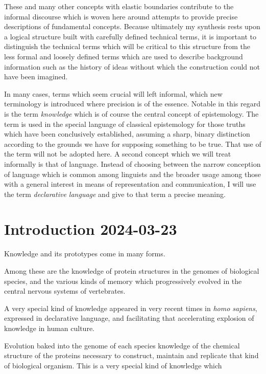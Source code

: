 \documentclass[10pt,titlepage]{book}
\begin{document}
These and many other concepts with elastic boundaries contribute to  the informal discourse which is woven here around attempts to provide precise descriptions of fundamental concepts.
Because ultimately my synthesis rests upon a logical structure built with carefully defined technical terms, it is important to distinguish the technical terms which will be critical to this structure from the less formal and loosely defined terms which are used to describe background information such as the history of ideas without which the construction could not have been imagined.

In many cases, terms which seem crucial will left informal, which new terminology is introduced where precision is of the essence.
Notable in this regard is the term \emph{knowledge} which is of course the central concept of epistemology.
The term is used in the special language of classical epistemology for those truths which have been conclusively established, assuming a sharp, binary distinction according to the grounds we have for supposing something to be true.
That use of the term will not be adopted here.
A second concept which we will treat informally is that of language.
Instead of choosing between the narrow conception of language which is common among linguists and the broader usage among those with a general interest in means of representation and communication, I will use the term \emph{declarative language} and give to that term a precise meaning.

\chapter{Introduction 2024-03-23}

Knowledge and its prototypes come in many forms.

Among these are the knowledge of protein structures in the genomes of biological species, and the various kinds of memory which progressively evolved in the central nervous systems of vertebrates.

A very special kind of knowledge appeared in very recent times in \emph{homo sapiens}, expressed in declarative language, and facilitating that accelerating explosion of knowledge in human culture.




Evolution baked into the genome of each species knowledge of the chemical structure of the proteins necessary to construct, maintain and replicate that kind of biological organism.
This is a very special kind of knowledge which
\end{document}
